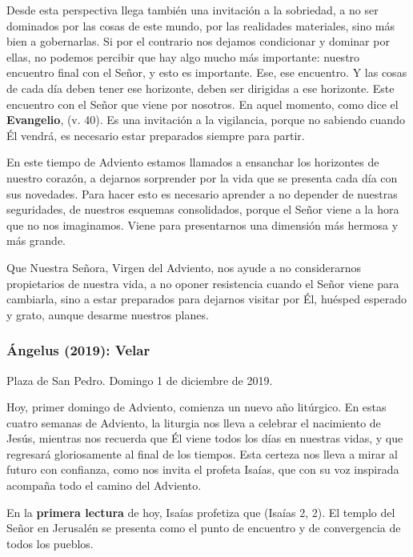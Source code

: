 \begin{body}
Desde esta perspectiva llega también una invitación a la sobriedad, a no ser dominados por las cosas de este mundo, por las realidades materiales, sino más bien a gobernarlas. Si por el contrario nos dejamos condicionar y dominar por ellas, no podemos percibir que hay algo mucho más importante: nuestro encuentro final con el Señor, y esto es importante. Ese, ese encuentro. Y las cosas de cada día deben tener ese horizonte, deben ser dirigidas a ese horizonte. Este encuentro con el Señor que viene por nosotros. En aquel momento, como dice el \textbf{Evangelio},  (v. 40). Es una invitación a la vigilancia, porque no sabiendo cuando Él vendrá, es necesario estar preparados siempre para partir.

En este tiempo de Adviento estamos llamados a ensanchar los horizontes de nuestro corazón, a dejarnos sorprender por la vida que se presenta cada día con sus novedades. Para hacer esto es necesario aprender a no depender de nuestras seguridades, de nuestros esquemas consolidados, porque el Señor viene a la hora que no nos imaginamos. Viene para presentarnos una dimensión más hermosa y más grande.

Que Nuestra Señora, Virgen del Adviento, nos ayude a no considerarnos propietarios de nuestra vida, a no oponer resistencia cuando el Señor viene para cambiarla, sino a estar preparados para dejarnos visitar por Él, huésped esperado y grato, aunque desarme nuestros planes.

\subsubsection{Ángelus (2019): Velar}

Plaza de San Pedro. Domingo 1 de diciembre de 2019.

Hoy, primer domingo de Adviento, comienza un nuevo año litúrgico. En estas cuatro semanas de Adviento, la liturgia nos lleva a celebrar el nacimiento de Jesús, mientras nos recuerda que Él viene todos los días en nuestras vidas, y que regresará gloriosamente al final de los tiempos. Esta certeza nos lleva a mirar al futuro con confianza, como nos invita el profeta Isaías, que con su voz inspirada acompaña todo el camino del Adviento.

En la \textbf{primera lectura} de hoy, Isaías profetiza que  (Isaías 2, 2). El templo del Señor en Jerusalén se presenta como el punto de encuentro y de convergencia de todos los pueblos.


\end{body}
